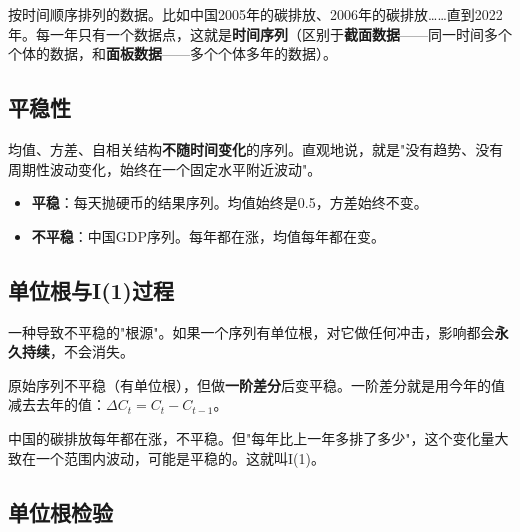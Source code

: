 \documentclass[12pt, a4paper]{article}
\begin{document}
\begin{conceptbox}[时间序列]
按时间顺序排列的数据。比如中国2005年的碳排放、2006年的碳排放……直到2022年。每一年只有一个数据点，这就是\textbf{时间序列}（区别于\textbf{截面数据}——同一时间多个个体的数据，和\textbf{面板数据}——多个个体多年的数据）。
\end{conceptbox}

\subsection{平稳性}

\begin{conceptbox}[平稳时间序列]
均值、方差、自相关结构\textbf{不随时间变化}的序列。直观地说，就是"没有趋势、没有周期性波动变化，始终在一个固定水平附近波动"。
\end{conceptbox}

\begin{examplebox}[平稳 vs 不平稳]
\begin{itemize}[leftmargin=2em]
\item \textbf{平稳}：每天抛硬币的结果序列。均值始终是0.5，方差始终不变。
\item \textbf{不平稳}：中国GDP序列。每年都在涨，均值每年都在变。
\end{itemize}
\end{examplebox}

\subsection{单位根与I(1)过程}

\begin{conceptbox}[单位根]
一种导致不平稳的"根源"。如果一个序列有单位根，对它做任何冲击，影响都会\textbf{永久持续}，不会消失。
\end{conceptbox}

\begin{conceptbox}[I(1)过程——"一阶单整"]
原始序列不平稳（有单位根），但做\textbf{一阶差分}后变平稳。一阶差分就是用今年的值减去去年的值：$\Delta C_t = C_t - C_{t-1}$。
\end{conceptbox}

\begin{examplebox}[I(1)的直觉]
中国的碳排放每年都在涨，不平稳。但"每年比上一年多排了多少"，这个变化量大致在一个范围内波动，可能是平稳的。这就叫I(1)。
\end{examplebox}

\subsection{单位根检验}
\end{document}
